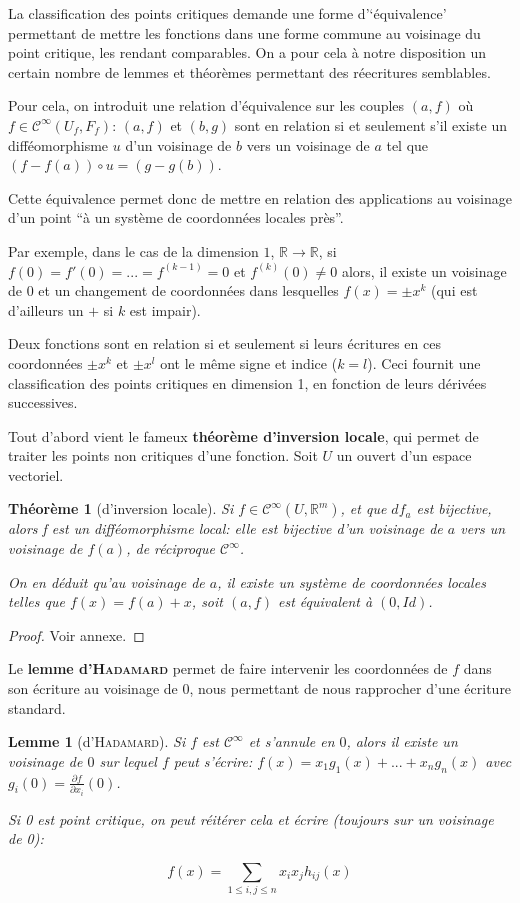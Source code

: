 \documentclass{article}
\newcommand{\cinf}{\mathcal{C}^\infty}
\newcommand{\R}{\mathbb{R}}
\newtheorem{thm}{Théorème}
\newtheorem{lemm}{Lemme}
\theoremstyle{definition}
\begin{document}
La classification des points critiques demande une forme d'`équivalence' permettant de mettre les fonctions dans une forme commune au voisinage du point critique, les rendant comparables.
On a pour cela à notre disposition un certain nombre de lemmes et théorèmes permettant des réecritures semblables.

Pour cela, on introduit une relation d'équivalence sur les couples $(a,f)$ où $f\in\cinf(U_f,F_f)$: $(a,f)$ et $(b,g)$ sont en relation si et seulement s'il existe un difféomorphisme $u$ d'un voisinage de $b$ vers un voisinage de $a$ tel que $(f-f(a))\circ u = (g-g(b))$.

Cette équivalence permet donc de mettre en relation des applications au voisinage d'un point ``à un système de coordonnées locales près''.

Par exemple, dans le cas de la dimension $1$, $\R\to\R$, si $f(0)=f'(0)=...=f^{(k-1)}=0$ et $f^{(k)}(0)\neq 0$ alors, il existe un voisinage de 0 et un changement de coordonnées dans lesquelles $f(x)=\pm x^k$ (qui est d'ailleurs un $+$ si $k$ est impair).

Deux fonctions sont en relation si et seulement si leurs écritures en ces coordonnées $\pm x^k$ et $\pm x^l$ ont le même signe et indice ($k=l$). Ceci fournit une classification des points critiques en dimension 1, en fonction de leurs dérivées successives.

Tout d'abord vient le fameux \textbf{théorème d'inversion locale}, qui permet de traiter les points non critiques d'une fonction. Soit $U$ un ouvert d'un espace vectoriel.

\begin{thm}[d'inversion locale]
	Si $f\in\cinf(U,\R^m)$, et que $df_a$ est bijective, alors f est un difféomorphisme local: elle est bijective d'un voisinage de $a$ vers un voisinage de $f(a)$, de réciproque $\cinf$.

	On en déduit qu'au voisinage de $a$, il existe un système de coordonnées locales telles que $f(x)=f(a)+x$, soit $(a,f)$ est équivalent à $(0,Id)$.
\end{thm}

\begin{proof} Voir annexe. \end{proof}

Le \textbf{lemme d'\textsc{Hadamard}} permet de faire intervenir les coordonnées de $f$ dans son écriture au voisinage de $0$, nous permettant de nous rapprocher d'une écriture standard.

\begin{lemm}[d'\textsc{Hadamard}]
	Si $f$ est $\cinf$ et s'annule en $0$, alors il existe un voisinage de $0$ sur lequel $f$ peut s'écrire: $f(x)=x_1g_1(x)+...+x_ng_n(x)$ avec $g_i(0) = \frac{\partial f}{\partial x_i}(0)$.

	Si 0 est point critique, on peut réitérer cela et écrire (toujours sur un voisinage de 0):

	$$f(x)=\sum_{1\leq i,j \leq n} x_ix_jh_{ij}(x)$$
\end{lemm}
\end{document}
